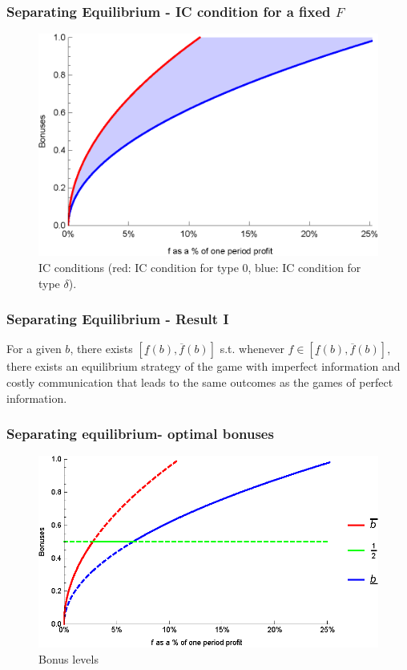 \documentclass[xcolor=dvipsnames]{beamer}
\begin{document}
\begin{frame}
\frametitle{Separating Equilibrium - IC condition for a fixed $F$}
\begin{figure}
\centering
\includegraphics[scale=0.7]{Plots/sep_IC_bonuses.eps}
\caption{IC conditions (red: IC condition for type $0$, blue: IC condition for type $\delta$).}\label{fig:sep_IC_bonuses}
\end{figure}
\end{frame}

\begin{frame}
\frametitle{Separating Equilibrium - Result I}
For a given $b$, there exists $[\underline f(b),\overline f(b)]$ s.t. whenever $f \in [\underline f(b),\overline f(b)]$, there exists an equilibrium strategy of the game with imperfect information and costly communication  that leads to the same outcomes as the games of perfect information.
\end{frame}

\begin{frame}
\frametitle{Separating equilibrium- optimal bonuses}
\begin{figure}[h!]
\centering
\includegraphics[]{Plots/bonuses_diff.eps}
\caption{Bonus levels}\label{fig:bonuses}
\end{figure}
\end{frame}
\end{document}
